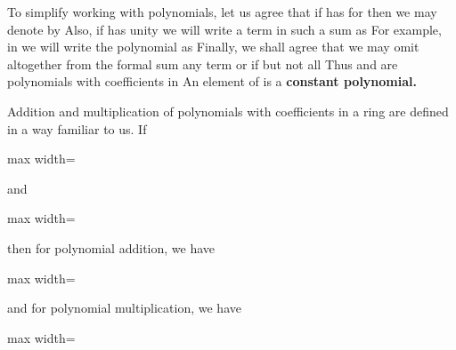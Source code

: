 \documentclass[11pt,oneside]{article}
\begin{document}
\begin{BookBody}
To simplify working with polynomials, let us agree that if   has  for  then we may denote  by  Also, if  has unity  we will write a term  in such a sum as  For example, in  we will write the polynomial  as  Finally, we shall agree that we may omit altogether from the formal sum any term  or  if  but not all  Thus  and  are polynomials with coefficients in  An element of  is a \textbf{constant polynomial.}

Addition and multiplication of polynomials with coefficients in a ring  are defined in a way familiar to us. If

\begin{center}\begin{adjustbox}{max width=\linewidth}\end{adjustbox}\end{center}

\noindent and

\begin{center}\begin{adjustbox}{max width=\linewidth}\end{adjustbox}\end{center}

\noindent then for polynomial addition, we have

\begin{center}\begin{adjustbox}{max width=\linewidth}\end{adjustbox}\end{center}

\noindent and for polynomial multiplication, we have

\begin{center}\begin{adjustbox}{max width=\linewidth}\end{adjustbox}\end{center}


\end{BookBody}
\end{document}
